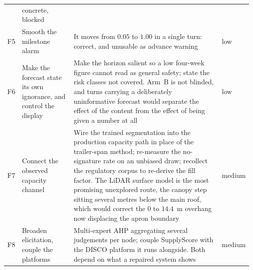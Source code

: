 \begin{table}[htbp]
\begin{tabularx}{\linewidth}{@{}p{0.4cm} >{\raggedright\arraybackslash}p{3.5cm} X
                                 >{\raggedright\arraybackslash}p{2.0cm}@{}}
& concrete, blocked \\
\addlinespace
F5 & Smooth the milestone alarm
& It moves from $0.05$ to $1.00$ in a single turn: correct, and unusable as advance warning
& low \\
\addlinespace
F6 & Make the forecast state its own ignorance, and control the display
& Make the horizon salient so a low four-week figure cannot read as general safety; state the
risk classes not covered. Arm~B is not blinded, and turns carrying a deliberately
uninformative forecast would separate the effect of the content from the effect of being
given a number at all
& low \\
\addlinespace
F7 & Connect the observed capacity channel
& Wire the trained segmentation into the production capacity path in place of the
trailer-span method; re-measure the no-signature rate on an unbiased draw; recollect the
regulatory corpus to re-derive the fill factor. The LiDAR surface model is the most promising
unexplored route, the canopy step sitting several metres below the main roof, which would
correct the $0$ to $14.4$~m overhang now displacing the apron boundary
& medium \\
\addlinespace
F8 & Broaden elicitation, couple the platforms
& Multi-expert AHP aggregating several judgements per node; couple SupplyScore with the DISCO
platform it runs alongside. Both depend on what a repaired system shows
& medium \\
\bottomrule
\end{tabularx}
\end{table}
